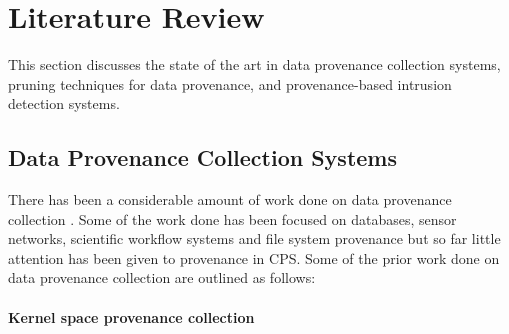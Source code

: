 


\chapter{Literature Review}\label{background}

This section discusses the state of the art in data provenance collection systems, pruning techniques for data provenance, and provenance-based intrusion detection systems.


\section{Data Provenance Collection Systems}

There has been a considerable amount of work done on data provenance collection \cite{_general-purpose_2012, bates_trustworthy_2015, gessiou_towards_2012, muniswamy_reddy_provenance_2010}. Some of the work done has been focused on databases, sensor networks, scientific workflow systems and file system provenance but so far little attention has been given to provenance in CPS. Some of the prior work done on data provenance collection are outlined as follows:




\subsubsection{Kernel space provenance collection}

